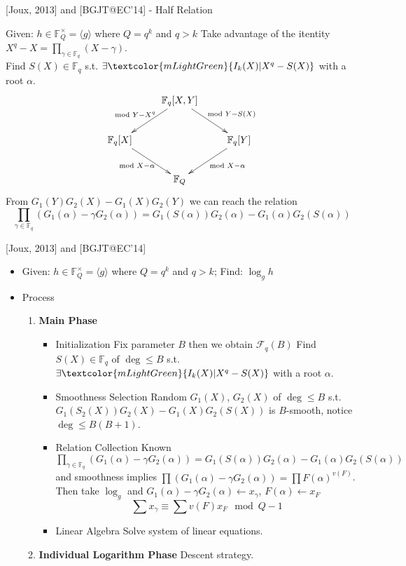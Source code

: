 \documentclass{beamer}
\begin{document}
		\begin{frame}{[Joux, 2013] and [BGJT@EC'14] - Half Relation}
			\begin{block}{Given: $h\in\mathbb{F}_Q^\times =\langle g\rangle$ where $Q = q^k$ and $q>k$}
				Take advantage of the itentity
				$X^q - X = \prod_{\gamma\in\mathbb{F}_q} (X - \gamma)$.\\
				\pause
				Find $S(X)\in\mathbb{F}_q$ s.t. $\exists\textcolor{mLightGreen}{I_k(X)|X^q - S(X)}$ with a root $\alpha$.
				$$\xymatrix{
					& \mathbb{F}_q[X, Y] \ar[dl]_{\mod Y - X^q} \ar[dr]^{\mod Y - S(X)} & \\
					\mathbb{F}_q[X] \ar[dr]_{\mod X - \alpha} & & \mathbb{F}_q[Y] \ar[dl]^{\mod X - \alpha}\\
					& \mathbb{F}_Q &
				}$$
				\pause
				From $G_1(Y)G_2(X)-G_1(X)G_2(Y)$ we can reach the relation
				$$\prod_{\gamma\in\mathbb{F}_q}(G_1(\alpha)-\gamma G_2(\alpha)) = G_1(S(\alpha))G_2(\alpha) - G_1(\alpha)G_2(S(\alpha))$$
			\end{block}
		\end{frame}

		\begin{frame}{[Joux, 2013] and [BGJT@EC'14]}
			\begin{itemize}
				\item
					Given: $h\in\mathbb{F}_Q^\times =\langle g\rangle$ where $Q = q^k$ and $q>k$; Find: $\log_g h$\\
				\item
					Process
					\begin{enumerate}
						\item\textbf{Main Phase}
						\begin{itemize}
							\item
								\alert{Initialization} 
									Fix parameter $B$ then we obtain $\mathcal{F}_q(B)$
									Find $S(X)\in\mathbb{F}_q$ of $\deg\leq B$ s.t. 
									$\exists\textcolor{mLightGreen}{I_k(X)|X^q - S(X)}$ with a root $\alpha$.
							\item
								\alert{Smoothness Selection} 
								Random $G_1(X)$, $G_2(X)$ of $\deg\leq B$ s.t. 
								$G_1(S_2(X))G_2(X) - G_1(X)G_2(S(X))$ is $B$-smooth, 
								notice $\deg\leq B(B+1)$.
							\item
								\alert{Relation Collection} Known
								$\prod_{\gamma\in\mathbb{F}_q}(G_1(\alpha)-\gamma G_2(\alpha)) = G_1(S(\alpha))G_2(\alpha) - G_1(\alpha)G_2(S(\alpha))$
								and smoothness implies 
								$\prod (G_1(\alpha)-\gamma G_2(\alpha)) = \prod F(\alpha)^{v(F)}$.
								Then take $\log_g$ and $G_1(\alpha)-\gamma G_2(\alpha)\leftarrow x_\gamma$, $F(\alpha)\leftarrow x_F$
								$$\sum x_\gamma \equiv \sum v(F) x_F \mod Q-1$$
							\item
								\alert{Linear Algebra} Solve system of linear equations.
						\end{itemize}
						\item\textbf{Individual Logarithm Phase} Descent strategy.
					\end{enumerate}
			\end{itemize}
		\end{frame}
\end{document}
